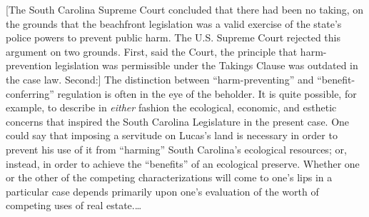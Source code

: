 [The South Carolina Supreme Court concluded that there had been no taking, on
the grounds that the beachfront legislation was a valid exercise of the state's
police powers to prevent public harm. The U.S. Supreme Court rejected this
argument on two grounds. First, said the Court, the principle that
harm-prevention legislation was permissible under the Takings Clause was
outdated in the case law. Second:]
%
The distinction between
``harm-preventing'' and ``benefit-conferring'' regulation is often in the eye of
the beholder. It is quite possible, for example, to describe in \textit{either}
fashion the ecological, economic, and esthetic concerns that inspired the South
Carolina Legislature in the present case. One could say that imposing a
servitude on Lucas's land is necessary in order to prevent his use of it from
``harming'' South Carolina's ecological resources; or, instead, in order to
achieve the ``benefits'' of an ecological preserve.
Whether one or the other of
the competing characterizations will come to one's lips in a particular case
depends primarily upon one's evaluation of the worth of competing uses of real
estate.\ldots

